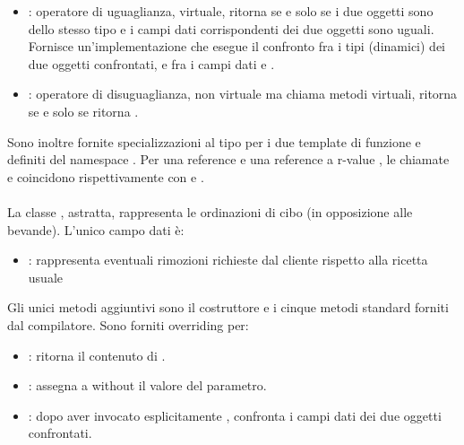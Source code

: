 \begin{itemize}
\begin{itemize}
		\item {}: operatore di uguaglianza, virtuale,  ritorna  se e solo se i due oggetti sono dello stesso tipo e i campi dati corrispondenti dei due oggetti sono uguali. Fornisce un'implementazione che esegue il confronto fra i tipi (dinamici) dei due oggetti confrontati, e fra i campi dati  e .
		\item {}: operatore di disuguaglianza, non virtuale ma chiama metodi virtuali,  ritorna  se e solo se  ritorna .
	\end{itemize}
\end{itemize}
Sono inoltre fornite specializzazioni al tipo  per i due template di funzione  e  definiti del namespace . Per una reference  e una reference a r-value , le chiamate  e  coincidono rispettivamente con  e .
\paragraph{} %
\label{par:food}
La classe , astratta, rappresenta le ordinazioni di cibo (in opposizione alle bevande). L'unico campo dati è:
\begin{itemize}
	\item {}: rappresenta eventuali rimozioni richieste dal cliente rispetto alla ricetta usuale
\end{itemize}
Gli unici metodi aggiuntivi sono il costruttore e i cinque metodi standard forniti dal compilatore. Sono forniti overriding per:
\begin{itemize}
	\item {}: ritorna il contenuto di .
	\item {}: assegna a without il valore del parametro.
	\item {}: dopo aver invocato esplicitamente , confronta i campi dati  dei due oggetti confrontati.
\end{itemize}
